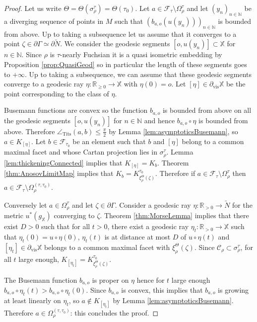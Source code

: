 \documentclass[reqno,10pt]{amsart}
\theoremstyle{plain}
\theoremstyle{definition}
\theoremstyle{remark}
\newcommand{\type}{\tau}
\newcommand{\typeS}{{\tau_0}}
\newcommand{\R}{\mathbb{R}}
\newcommand{\N}{\mathbb{N}}
\newcommand{\Tangle}{\angle_\text{Tits}}
\DeclareMathOperator{\vis}{vis}
\newcommand{\partialvis}{\partial_{\vis}}
\newcommand{\X}{\mathbb{X}}
\begin{document}
\begin{proof}
Let us write $\Theta=\Theta(\sigma^\type_\rho)=\Theta(\typeS)$. Let $a\in\mathcal{F}_\type\setminus \Omega^\type_\rho$ and let $(y_n)_{n\in \N}$ be a diverging sequence of points in $M$ such that $\left(b_{a,o}(u(y_n))\right)_{n\in \N}$ is bounded from above. Up to taking a subsequence let us assume that it converges to a point $\zeta\in \partial\Gamma\simeq\partial \widetilde{N}$. We consider the geodesic segments $[o,u(y_n)]\subset \X$ for $n\in \N$. 
Since $\rho$ is $\type$-nearly Fuchsian it is a quasi isometric embedding by Proposition \ref{prop:QuasiGeod} so in particular the length of these segments goes to $+\infty$. Up to taking a subsequence, we can assume that these geodesic segments converge to a geodesic ray $\eta:\R_{\geq 0} \to \X$ with $\eta(0)=o$. Let $[\eta]\in \partialvis \X$ be the point corresponding to the class of $\eta$.

Busemann functions are convex so the function $b_{a,o}$ is bounded from above on all the geodesic segments $[o,u(y_n)]$ for $n\in \N$ and hence $b_{a,o}\circ \eta$ is bounded from above. Therefore $\Tangle (a,b)\leq \frac{\pi}{2}$ by Lemma \ref{lem:asymptoticsBusemann}, so $a\in K_{[\eta]}$.
Let $b\in \mathcal{F}_\typeS$ be an element such that $b$ and $[\eta]$ belong to a common maximal facet and whose Cartan projection lies in $\sigma_\rho^\type$. Lemma \ref{lem:thickeningConnected} implies that $K_{[\eta]}=K_b$.
 Theorem \ref{thm:AnosovLimitMap} implies that $K_{b}=K^\typeS_{\xi^{\Theta}_\rho(\zeta)}$. Therefore if $a\in \mathcal{F}_\type\setminus \Omega^\type_\rho$ then $a\in \mathcal{F}_\type\setminus \Omega^{(\type,\typeS)}_\rho$.

\medskip

Conversely let $a\in \Omega^\type_\rho$ and let $\zeta\in \partial\Gamma$. Consider a geodesic ray $\eta:\R_{>0}\to \widetilde{N}$ for the metric $u^*(g_\X)$ converging to $\zeta$. Theorem \ref{thm:MorseLemma} implies that there exist $D>0$ such that for all $t>0$, there exist a geodesic ray $\eta_t :\R_{>0}\to \X$ such that $\eta_t(0)= u\circ\eta(0)$, $\eta_t(t)$ is at distance at most $D$ of $u\circ \eta(t)$ and $[\eta_t]\in \partialvis\X$ belongs to a common maximal facet with $\xi_\rho^\Theta(\zeta)$.
Since $\mathcal{C}_\rho\subset \sigma_\rho^\type$, for all $t$ large enough, $K_{[\eta_t]}=K^\typeS_{\xi^\Theta_\rho(\zeta)}$.


The Busemann function $b_{a,o}$ is proper on $\eta$ hence for $t$ large enough $b_{a,o}\circ\eta_t(t)>b_{a,o}\circ\eta_t(0)$. Since $b_{a,o}$ is convex, this implies that $b_{a,o}$ is growing at least linearly on $\eta_t$, so $a\notin K_{[\eta_t]}$ by Lemma \ref{lem:asymptoticsBusemann}. Therefore $a\in \Omega_\rho^{(\type,\typeS)}$: this concludes the proof.
\end{proof}
\end{document}
